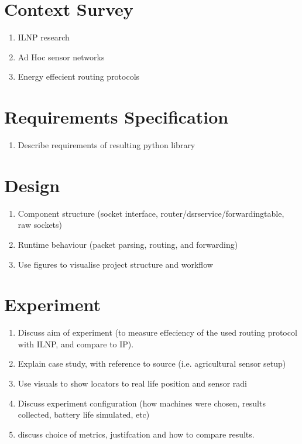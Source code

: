 \documentclass[12pt]{article}
\begin{document}
\section{Context Survey}

\begin{enumerate}
\item ILNP research 
\item Ad Hoc sensor networks
\item Energy effecient routing protocols
\end{enumerate}

\section{Requirements Specification}

\begin{enumerate}
\item Describe requirements of resulting python library
\end{enumerate}

\section{Design}

\begin{enumerate}
\item Component structure (socket interface, router/dsrservice/forwardingtable, raw sockets)
\item Runtime behaviour (packet parsing, routing, and forwarding)
\item Use figures to visualise project structure and workflow
\end{enumerate}

\section{Experiment}

\begin{enumerate}
\item Discuss aim of experiment (to measure effeciency of the used routing protocol with ILNP, and compare to IP).
\item Explain case study, with reference to source (i.e. agricultural sensor setup)
\item Use visuals to show locators to real life position and sensor radi
\item Discuss experiment configuration (how machines were chosen, results collected, battery life simulated, etc)
\item discuss choice of metrics, justifcation and how to compare results.
\end{enumerate}
\end{document}

